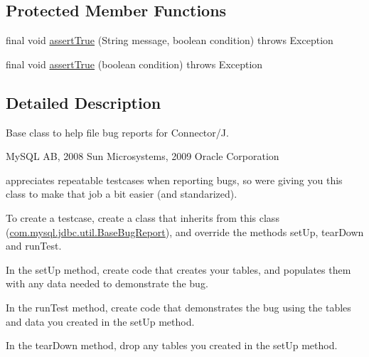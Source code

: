 \subsection*{Protected Member Functions}
\begin{DoxyCompactItemize}
\item 
final void \mbox{\hyperlink{classcom_1_1mysql_1_1jdbc_1_1util_1_1_base_bug_report_a5b56a6069b17d432a189c5185ec897c7}{assert\+True}} (String message, boolean condition)  throws Exception 
\item 
final void \mbox{\hyperlink{classcom_1_1mysql_1_1jdbc_1_1util_1_1_base_bug_report_a8b90786036a7a973ea14429854aa3f65}{assert\+True}} (boolean condition)  throws Exception 
\end{DoxyCompactItemize}


\subsection{Detailed Description}
Base class to help file bug reports for Connector/J.

My\+S\+QL AB, 2008 Sun Microsystems, 2009 Oracle Corporation


\begin{DoxyItemize}
\item 
\end{DoxyItemize}appreciates repeatable testcases when reporting bugs, so we\textquotesingle{}re giving you this class to make that job a bit easier (and standarized).

To create a testcase, create a class that inherits from this class (\mbox{\hyperlink{classcom_1_1mysql_1_1jdbc_1_1util_1_1_base_bug_report}{com.\+mysql.\+jdbc.\+util.\+Base\+Bug\+Report}}), and override the methods \textquotesingle{}set\+Up\textquotesingle{}, \textquotesingle{}tear\+Down\textquotesingle{} and \textquotesingle{}run\+Test\textquotesingle{}.

In the \textquotesingle{}set\+Up\textquotesingle{} method, create code that creates your tables, and populates them with any data needed to demonstrate the bug.

In the \textquotesingle{}run\+Test\textquotesingle{} method, create code that demonstrates the bug using the tables and data you created in the \textquotesingle{}set\+Up\textquotesingle{} method.

In the \textquotesingle{}tear\+Down\textquotesingle{} method, drop any tables you created in the \textquotesingle{}set\+Up\textquotesingle{} method.

